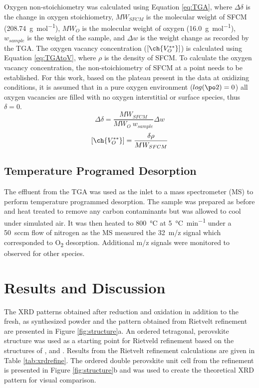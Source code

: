         Oxygen non-stoichiometry was calculated using Equation \ref{eq:TGA}, where $\Delta\delta$ is the change in oxygen stoichiometry, $MW_{SFCM}$ is the molecular weight of SFCM (\SI{208.74}{\gram\per\mol}), $MW_O$ is the molecular weight of oxygen (\SI{16.0}{\gram\per\mol}), $w_{sample}$ is the weight of the sample, and $\Delta{}w$ is the weight change as recorded by the TGA.
        The oxygen vacancy concentration ($\lbrack\ch{V_O^{**}}\rbrack$) is calculated using Equation \ref{eq:TGAtoV}, where $\rho$ is the density of SFCM.
        To calculate the oxygen vacancy concentration, the non-stoichiometry of SFCM at a point needs to be established.
        For this work, based on the plateau present in the data at oxidizing conditions, it is assumed that in a pure oxygen environment ($log(\po2{})=0$) all oxygen vacancies are filled with no oxygen interstitial or surface species, thus $\delta=0$.
        \begin{equation}
            \Delta\delta = \frac{MW_{SFCM}}{MW_O\ w_{sample}}\Delta{}w
            \label{eq:TGA}
        \end{equation}
        \begin{equation}
            \lbrack\ch{V_O^{**}}\rbrack =\frac{\delta\rho}{MW_{SFCM}}
            \label{eq:TGAtoV}
        \end{equation}

    \subsection{Temperature Programed Desorption}
        The effluent from the TGA was used as the inlet to a mass spectrometer (MS) to perform temperature programmed desorption.
        The sample was prepared as before and heat treated to remove any carbon contaminants but was allowed to cool under simulated air.
        It was then heated to \SI{800}{\celsius} at \SI{5}{\celsius\per\minute} under a \SI{50}{sccm} flow of nitrogen as the MS measured the \SI{32}{m/z} signal which corresponded to O\textsubscript{2} desorption.
        Additional m/z signals were monitored to observed for other species.

\section{Results and Discussion}
    The XRD patterns obtained after reduction and oxidation in addition to the fresh, as synthesized powder and the pattern obtained from Rietvelt refinement are presented in Figure \ref{fig:structure}a.
    An ordered tetragonal, perovskite structure was used as a starting point for Rietveld refinement based on the structures of ,  and .\cite{Huang2009,Ritter2004}
    Results from the Rietvelt refinement calculations are given in Table \ref{tab:xrdrefine}.
    The ordered double perovskite unit cell from the refinement is presented in Figure \ref{fig:structure}b and was used to create the theoretical XRD pattern for visual comparison.

